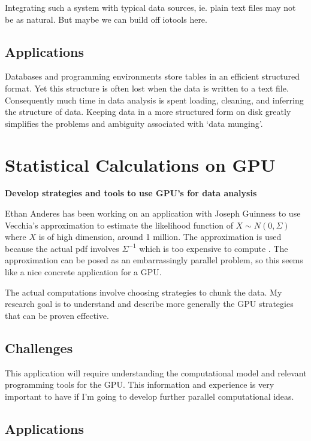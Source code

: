 \documentclass[12pt]{article}
\begin{document}
Integrating such a system with typical data sources, ie. plain text files may
not be as natural. But maybe we can build off iotools here.

\subsection{Applications}

Databases and programming environments store tables in an efficient
structured format. Yet this structure is often lost when the data is
written to a text file. Consequently much time in data analysis is
spent loading, cleaning, and inferring the structure of data. Keeping data
in a more structured form on disk greatly simplifies the problems and
ambiguity associated with `data munging'.


\section{Statistical Calculations on GPU}

\textbf{Develop strategies and tools to use GPU's for data analysis}

Ethan Anderes has been working on an application with Joseph Guinness to
use Vecchia's approximation to estimate the likelihood function of $X \sim
N(0, \Sigma)$ where $X$ is of high dimension, around 1 million. The
approximation is used because the actual pdf involves $\Sigma^{-1}$ which
is too expensive to compute \cite{guinness2016permutation}.  The
approximation can be posed as an embarrassingly parallel problem, so this
seems like a nice concrete application for a GPU.

The actual computations involve choosing strategies to chunk the data. 
My research goal is to understand and describe more generally the
GPU strategies that can be proven effective.

\subsection{Challenges}

This application will require understanding the computational model and
relevant programming tools for the GPU. This information and experience is
very important to have if I'm going to develop further parallel
computational ideas.

\subsection{Applications}
\end{document}
